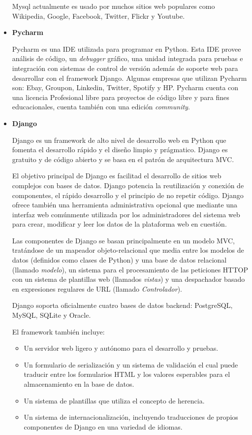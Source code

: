 \begin{itemize}
		Mysql actualmente es usado por muchos sitios web populares como Wikipedia, Google, Facebook, Twitter, Flickr y Youtube. 
		
	\item \textbf{Pycharm}
	
		Pycharm \cite{pycharmWeb} es una IDE utilizada para programar en Python. Esta IDE provee análisis de código, un \emph{debugger} gráfico, una unidad integrada para pruebas e integración con sistemas de control de versión además de soporte web para desarrollar con el framework Django. Algunas empresas que utilizan Pycharm son: Ebay, Groupon, Linkedin, Twitter, Spotify y HP. Pycharm cuenta con una licencia Profesional libre para proyectos de código libre y para fines educacionales, cuenta también con una edición \emph{community}.

	\item \textbf{Django}
	
	Django \cite{djangoWeb} es un framework de alto nivel de desarrollo web en Python que fomenta el desarrollo rápido y el diseño limpio y prágmatico. Django es gratuito y de código abierto y se basa en el patrón de arquitectura MVC.
	
	El objetivo principal de Django es facilitad el desarrollo de sitios web complejos con bases de datos. Django potencia la reutilización y conexión de componentes, el rápido desarrollo y el principio de no repetir código. Django ofrece también una herramienta administrativa opcional que mediante una interfaz web comúnmente utilizada por los administradores del sistema web para crear, modificar y leer los datos de la plataforma web en cuestión. 
	
	Las componentes de Django se basan principalmente en un modelo MVC, tratándose de un mapeador objeto-relacional que media entre los modelos de datos (definidos como clases de Python) y una base de datos relacional (llamado \emph{modelo}), un sistema para el procesamiento de las peticiones HTTOP con un sistema de plantillas web (llamados \emph{vistas}) y una despachador basado en expresiones regulares de URL (llamado \emph{Controlador}).
	
	Django soporta oficialmente cuatro bases de datos backend: PostgreSQL, MySQL, SQLite y Oracle.
	
	El framework también incluye:
	
	\begin{itemize}
		\item Un servidor web ligero y autónomo para el desarrollo y pruebas.
		\item Un formulario de serialización y un sistema de validación el cual puede traducir entre los formularios HTML y los valores esperables para el almacenamiento en la base de datos.
		\item Un sistema de plantillas que utiliza el concepto de herencia.
		\item Un sistema de internacionalización, incluyendo traducciones de propios componentes de Django en una variedad de idiomas.
	\end{itemize}
	

\end{itemize}
